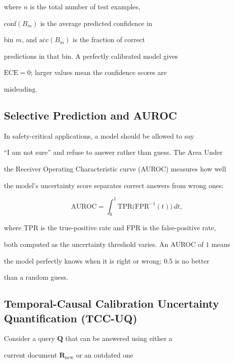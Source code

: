 \documentclass[10pt,twoside]{article}
\numberwithin{equation}{section}
\begin{document}
where $n$ is the total number of test examples,

$\overline{\mathrm{conf}}(B_m)$ is the average predicted confidence in

bin $m$, and $\overline{\mathrm{acc}}(B_m)$ is the fraction of correct

predictions in that bin. A perfectly calibrated model gives

$\mathrm{ECE}=0$; larger values mean the confidence scores are

misleading.



\subsection{Selective Prediction and AUROC}



In safety-critical applications, a model should be allowed to say

``I am not sure'' and refuse to answer rather than guess. The Area Under

the Receiver Operating Characteristic curve (AUROC) measures how well

the model's uncertainty score separates correct answers from wrong ones:

\begin{equation}

  \mathrm{AUROC} = \int_0^1 \mathrm{TPR}\bigl(\mathrm{FPR}^{-1}(t)\bigr)\,dt,

\end{equation}

where TPR is the true-positive rate and FPR is the false-positive rate,

both computed as the uncertainty threshold varies. An AUROC of $1$ means

the model perfectly knows when it is right or wrong; $0.5$ is no better

than a random guess.



\subsection{Temporal-Causal Calibration Uncertainty Quantification (TCC-UQ)}



Consider a query $\mathbf{Q}$ that can be answered using either a

current document $\mathbf{R}_{\mathrm{new}}$ or an outdated one
\end{document}
